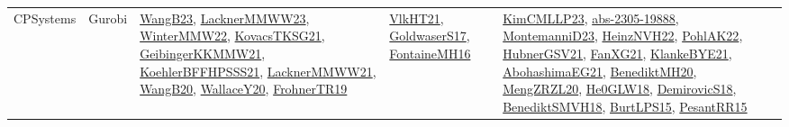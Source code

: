 {\begin{longtable}{lp{3cm}>{\raggedright}p{6cm}>{\raggedright}p{6cm}p{8cm}}
CPSystems & Gurobi & \href{papers/WangB23.pdf}{WangB23}\cite{WangB23}, \href{articles/LacknerMMWW23.pdf}{LacknerMMWW23}\cite{LacknerMMWW23}, \href{papers/WinterMMW22.pdf}{WinterMMW22}\cite{WinterMMW22}, \href{papers/KovacsTKSG21.pdf}{KovacsTKSG21}\cite{KovacsTKSG21}, \href{papers/GeibingerKKMMW21.pdf}{GeibingerKKMMW21}\cite{GeibingerKKMMW21}, \href{articles/KoehlerBFFHPSSS21.pdf}{KoehlerBFFHPSSS21}\cite{KoehlerBFFHPSSS21}, \href{papers/LacknerMMWW21.pdf}{LacknerMMWW21}\cite{LacknerMMWW21}, \href{papers/WangB20.pdf}{WangB20}\cite{WangB20}, \href{articles/WallaceY20.pdf}{WallaceY20}\cite{WallaceY20}, \href{papers/FrohnerTR19.pdf}{FrohnerTR19}\cite{FrohnerTR19} & \href{articles/VlkHT21.pdf}{VlkHT21}\cite{VlkHT21}, \href{papers/GoldwaserS17.pdf}{GoldwaserS17}\cite{GoldwaserS17}, \href{papers/FontaineMH16.pdf}{FontaineMH16}\cite{FontaineMH16} & \href{papers/KimCMLLP23.pdf}{KimCMLLP23}\cite{KimCMLLP23}, \href{articles/abs-2305-19888.pdf}{abs-2305-19888}\cite{abs-2305-19888}, \href{articles/MontemanniD23.pdf}{MontemanniD23}\cite{MontemanniD23}, \href{articles/HeinzNVH22.pdf}{HeinzNVH22}\cite{HeinzNVH22}, \href{articles/PohlAK22.pdf}{PohlAK22}\cite{PohlAK22}, \href{articles/HubnerGSV21.pdf}{HubnerGSV21}\cite{HubnerGSV21}, \href{articles/FanXG21.pdf}{FanXG21}\cite{FanXG21}, \href{papers/KlankeBYE21.pdf}{KlankeBYE21}\cite{KlankeBYE21}, \href{articles/AbohashimaEG21.pdf}{AbohashimaEG21}\cite{AbohashimaEG21}, \href{articles/BenediktMH20.pdf}{BenediktMH20}\cite{BenediktMH20}, \href{articles/MengZRZL20.pdf}{MengZRZL20}\cite{MengZRZL20}, \href{papers/He0GLW18.pdf}{He0GLW18}\cite{He0GLW18}, \href{papers/DemirovicS18.pdf}{DemirovicS18}\cite{DemirovicS18}, \href{papers/BenediktSMVH18.pdf}{BenediktSMVH18}\cite{BenediktSMVH18}, \href{papers/BurtLPS15.pdf}{BurtLPS15}\cite{BurtLPS15}, \href{papers/PesantRR15.pdf}{PesantRR15}\cite{PesantRR15}\\

\end{longtable}}
